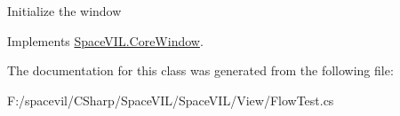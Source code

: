 Initialize the window 



Implements \mbox{\hyperlink{class_space_v_i_l_1_1_core_window_aa3cf4ac54d9651b1149584dc81042824}{Space\+V\+I\+L.\+Core\+Window}}.



The documentation for this class was generated from the following file\+:\begin{DoxyCompactItemize}
\item 
F\+:/spacevil/\+C\+Sharp/\+Space\+V\+I\+L/\+Space\+V\+I\+L/\+View/Flow\+Test.\+cs\end{DoxyCompactItemize}
